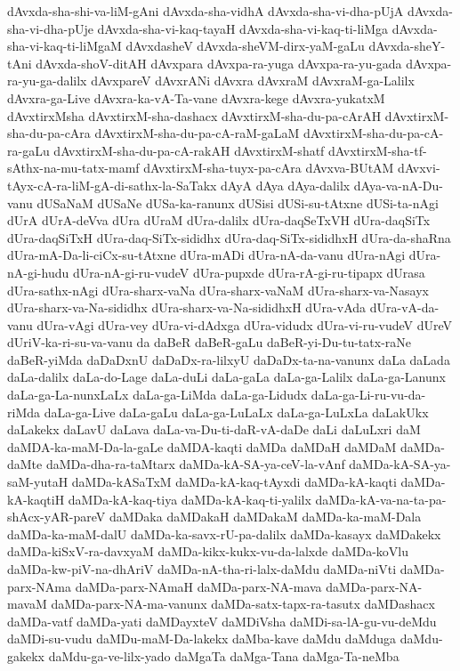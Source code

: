 {dAvxda-sha-shi-va-liM-gAni
dAvxda-sha-vidhA
dAvxda-sha-vi-dha-pUjA
dAvxda-sha-vi-dha-pUje
dAvxda-sha-vi-kaq-tayaH
dAvxda-sha-vi-kaq-ti-liMga
dAvxda-sha-vi-kaq-ti-liMgaM
dAvxdasheV
dAvxda-sheVM-dirx-yaM-gaLu
dAvxda-sheY-tAni
dAvxda-shoV-ditAH
dAvxpara
dAvxpa-ra-yuga
dAvxpa-ra-yu-gada
dAvxpa-ra-yu-ga-dalilx
dAvxpareV
dAvxrANi
dAvxra
dAvxraM
dAvxraM-ga-Lalilx
dAvxra-ga-Live
dAvxra-ka-vA-Ta-vane
dAvxra-kege
dAvxra-yukatxM
dAvxtirxMsha
dAvxtirxM-sha-dashacx
dAvxtirxM-sha-du-pa-cArAH
dAvxtirxM-sha-du-pa-cAra
dAvxtirxM-sha-du-pa-cA-raM-gaLaM
dAvxtirxM-sha-du-pa-cA-ra-gaLu
dAvxtirxM-sha-du-pa-cA-rakAH
dAvxtirxM-shatf
dAvxtirxM-sha-tf-sAthx-na-mu-tatx-mamf
dAvxtirxM-sha-tuyx-pa-cAra
dAvxva-BUtAM
dAvxvi-tAyx-cA-ra-liM-gA-di-sathx-la-SaTakx
dAyA
dAya
dAya-dalilx
dAya-va-nA-Du-vanu
dUSaNaM
dUSaNe
dUSa-ka-ranunx
dUSisi
dUSi-su-tAtxne
dUSi-ta-nAgi
dUrA
dUrA-deVva
dUra
dUraM
dUra-dalilx
dUra-daqSeTxVH
dUra-daqSiTx
dUra-daqSiTxH
dUra-daq-SiTx-sididhx
dUra-daq-SiTx-sididhxH
dUra-da-shaRna
dUra-mA-Da-li-ciCx-su-tAtxne
dUra-mADi
dUra-nA-da-vanu
dUra-nAgi
dUra-nA-gi-hudu
dUra-nA-gi-ru-vudeV
dUra-pupxde
dUra-rA-gi-ru-tipapx
dUrasa
dUra-sathx-nAgi
dUra-sharx-vaNa
dUra-sharx-vaNaM
dUra-sharx-va-Nasayx
dUra-sharx-va-Na-sididhx
dUra-sharx-va-Na-sididhxH
dUra-vAda
dUra-vA-da-vanu
dUra-vAgi
dUra-vey
dUra-vi-dAdxga
dUra-vidudx
dUra-vi-ru-vudeV
dUreV
dUriV-ka-ri-su-va-vanu
da
daBeR
daBeR-gaLu
daBeR-yi-Du-tu-tatx-raNe
daBeR-yiMda
daDaDxnU
daDaDx-ra-lilxyU
daDaDx-ta-na-vanunx
daLa
daLada
daLa-dalilx
daLa-do-Lage
daLa-duLi
daLa-gaLa
daLa-ga-Lalilx
daLa-ga-Lanunx
daLa-ga-La-nunxLaLx
daLa-ga-LiMda
daLa-ga-Lidudx
daLa-ga-Li-ru-vu-da-riMda
daLa-ga-Live
daLa-gaLu
daLa-ga-LuLaLx
daLa-ga-LuLxLa
daLakUkx
daLakekx
daLavU
daLava
daLa-va-Du-ti-daR-vA-daDe
daLi
daLuLxri
daM
daMDA-ka-maM-Da-la-gaLe
daMDA-kaqti
daMDa
daMDaH
daMDaM
daMDa-daMte
daMDa-dha-ra-taMtarx
daMDa-kA-SA-ya-ceV-la-vAnf
daMDa-kA-SA-ya-saM-yutaH
daMDa-kASaTxM
daMDa-kA-kaq-tAyxdi
daMDa-kA-kaqti
daMDa-kA-kaqtiH
daMDa-kA-kaq-tiya
daMDa-kA-kaq-ti-yalilx
daMDa-kA-va-na-ta-pa-shAcx-yAR-pareV
daMDaka
daMDakaH
daMDakaM
daMDa-ka-maM-Dala
daMDa-ka-maM-dalU
daMDa-ka-savx-rU-pa-dalilx
daMDa-kasayx
daMDakekx
daMDa-kiSxV-ra-davxyaM
daMDa-kikx-kukx-vu-da-lalxde
daMDa-koVlu
daMDa-kw-piV-na-dhAriV
daMDa-nA-tha-ri-lalx-daMdu
daMDa-niVti
daMDa-parx-NAma
daMDa-parx-NAmaH
daMDa-parx-NA-mava
daMDa-parx-NA-mavaM
daMDa-parx-NA-ma-vanunx
daMDa-satx-tapx-ra-tasutx
daMDashacx
daMDa-vatf
daMDa-yati
daMDayxteV
daMDiVsha
daMDi-sa-lA-gu-vu-deMdu
daMDi-su-vudu
daMDu-maM-Da-lakekx
daMba-kave
daMdu
daMduga
daMdu-gakekx
daMdu-ga-ve-lilx-yado
daMgaTa
daMga-Tana
daMga-Ta-neMba
}
